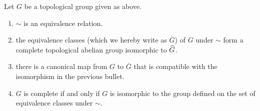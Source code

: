 \begin{prop}
Let $G$ be a topological group given as above.

\begin{enumerate}\label{prop:cauchy_and_compl}
\item $\sim$ is an equivalence relation.

\item the equivalence classes (which we hereby write as 
$\overline{G}$) of $G$ under $\sim$ form a complete topological 
abelian group isomorphic to $\widehat{G}$.

\item there is a canonical map from $G$ to $\overline{G}$ that is
compatible with the isomorphism in the previous bullet.

\item $G$ is complete if and only if $G$ is isomorphic to the
group defined on the set of equivalence classes under $\sim$.
\end{enumerate}
\end{prop}
